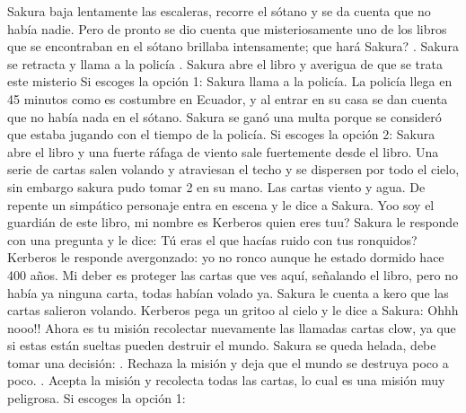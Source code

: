 \documentclass[12pt]{report}
\begin{document}
Sakura baja lentamente las escaleras, recorre el sótano y se da cuenta que no había nadie. Pero de pronto se dio cuenta que misteriosamente uno de los libros que se encontraban en el sótano brillaba intensamente; que hará Sakura?
\newline
{}.	Sakura se retracta y llama a la policía
\newline
{}.	Sakura abre el libro y averigua de que se trata este misterio
\newline
\newline
Si escoges la opción 1:
Sakura llama a la policía. La policía llega en 45 minutos como es costumbre en Ecuador, y al entrar en su casa se dan cuenta que no había nada en el sótano. Sakura se ganó una multa porque se consideró que estaba jugando con el tiempo de la policía.
\newline
\newline
Si escoges la opción 2:
\newline
\newline
Sakura abre el libro y una fuerte ráfaga de viento sale fuertemente desde el libro. Una serie de cartas salen volando y atraviesan el techo y se dispersen por todo el cielo, sin embargo sakura pudo tomar 2 en su mano. Las cartas viento y agua. De repente un simpático personaje entra en escena y le dice a Sakura.  Yoo soy el guardián de este libro, mi nombre es Kerberos quien eres tuu?
Sakura le responde con una pregunta y le dice: Tú eras el que hacías ruido con tus ronquidos?
Kerberos le responde avergonzado: yo no ronco aunque he estado dormido hace 400 años. Mi deber es proteger las cartas que ves aquí, señalando el libro, pero no había ya ninguna carta, todas habían volado ya.
Sakura le cuenta a kero que las cartas salieron volando.
Kerberos pega un gritoo al cielo y le dice a Sakura: Ohhh nooo!! Ahora es tu misión recolectar nuevamente las llamadas cartas clow, ya que si estas están sueltas pueden destruir el mundo.
\newline
\newline
Sakura se queda helada, debe tomar una decisión:
\newline
{}.	Rechaza la misión y deja que el mundo se destruya poco a poco.
.	Acepta la misión y recolecta todas las cartas, lo cual es una misión muy peligrosa.
\newline
Si escoges la opción 1:
\newline
\end{document}
